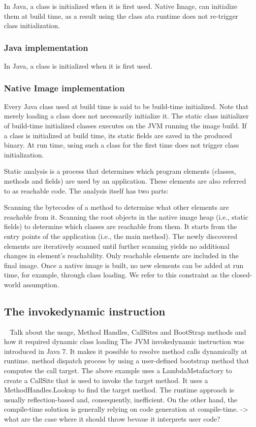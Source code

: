 In Java, a class is initialized when it is first used. Native Image, can initialize them at build time, as a result using the class ata runtime does not re-trigger class initialization.

\subsubsection{Java implementation}
In Java, a class is initialized when it is first used.
\subsubsection{Native Image implementation}
Every Java class used at build time is said to be build-time initialized. Note that merely loading a class does not necessarily initialize it. The static class initializer of build-time initialized classes executes on the JVM running the image build. If a class is initialized at build time, its static fields are saved in the produced binary. At run time, using such a class for the first time does not trigger class initialization.

Static analysis is a process that determines which program elements (classes, methods and fields) are used by an application. These elements are also referred to as reachable code. The analysis itself has two parts:

Scanning the bytecodes of a method to determine what other elements are reachable from it.
Scanning the root objects in the native image heap (i.e., static fields) to determine which classes are reachable from them. It starts from the entry points of the application (i.e., the main method). The newly discovered elements are iteratively scanned until further scanning yields no additional changes in element’s reachability.
Only reachable elements are included in the final image. Once a native image is built, no new elements can be added at run time, for example, through class loading. We refer to this constraint as the closed-world assumption.

\subsection{The invokedynamic instruction}
~\cite{rose_bytecodes_2009}
Talk about the usage, Method Handles, CallSites and BootStrap methods and how it required dynamic class loading
The JVM invokedynamic instruction was introduced in Java 7. It makes it possible to resolve method calls dynamically at runtime. method dispatch process by using a user-defined bootstrap method that computes the call target.
The above example uses a LambdaMetafactory to create a CallSite that is used to invoke the target method. It uses a MethodHandles.Lookup to find the target method.
The runtime approach is usually reflection-based and, consequently, inefficient. On the other hand, the compile-time solution is generally relying on code generation at compile-time. 
-> what are the case where it should throw bevaue it interprets user code?

